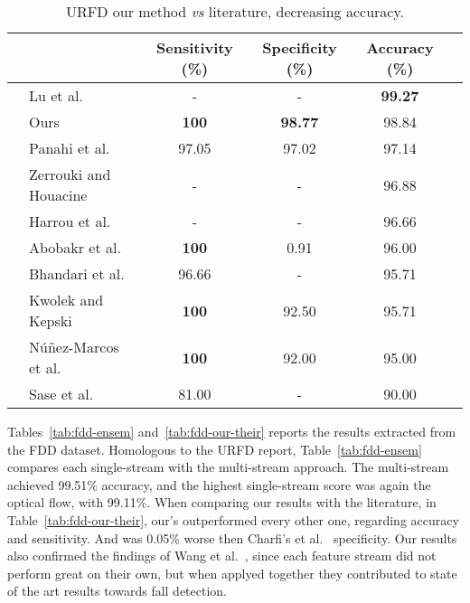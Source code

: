 \documentclass[conference]{IEEEtran}
\begin{document}
\begin{table*}[t]
\centering
\caption{URFD our method \textit{vs} literature, decreasing accuracy.}
\label{tab:urfd-our-their}
\begin{tabular}{llcccl}
\hline
 &                                                      & Sensitivity (\%)  & Specificity (\%)  & Accuracy (\%)     & \\ \hline
 & Lu et al.~\cite{lu2018deep}                          & -                 & -                 & \textbf{99.27}    & \\
 & Ours                                                 & \textbf{100}      & \textbf{98.77}    & 98.84             & \\
 & Panahi et al.~\cite{panahi2018human}                 & 97.05             & 97.02             & 97.14             & \\
 & Zerrouki and Houacine~\cite{zerrouki2018combined}    & -                 & -                 & 96.88             & \\
 & Harrou et al.~\cite{harrou2017vision}                & -                 & -                 & 96.66             & \\
 & Abobakr et al.~\cite{abobakr2017skeleton}            & \textbf{100}      & 0.91              & 96.00             & \\
 & Bhandari et al.~\cite{bhandari2017novel}             & 96.66             & -                 & 95.71             & \\
 & Kwolek and Kepski~\cite{kwolek2015improving}         & \textbf{100}      & 92.50             & 95.71             & \\
 & N\'u\~nez-Marcos et al.~\cite{nunez2017vision}       & \textbf{100}      & 92.00             & 95.00             & \\
 & Sase et al.~\cite{sase2018human}                     & 81.00             & -                 & 90.00             & \\ \hline
\end{tabular}
\end{table*}

Tables~\ref{tab:fdd-ensem} and~\ref{tab:fdd-our-their} reports the results extracted from the FDD dataset. Homologous to the URFD report, Table~\ref{tab:fdd-ensem} compares each single-stream with the multi-stream approach. The multi-stream achieved 99.51\% accuracy, and the highest single-stream score was again the optical flow, with 99.11\%. When comparing our results with the literature, in Table~\ref{tab:fdd-our-their}, our's outperformed every other one, regarding accuracy and sensitivity. And was 0.05\% worse then Charfi's et al.~\cite{charfi2013optimised} specificity. Our results also confirmed the findings of Wang et al.~\cite{wang2015towards}, since each feature stream did not perform great on their own, but when applyed together they contributed to state of the art results towards fall detection.
\end{document}
